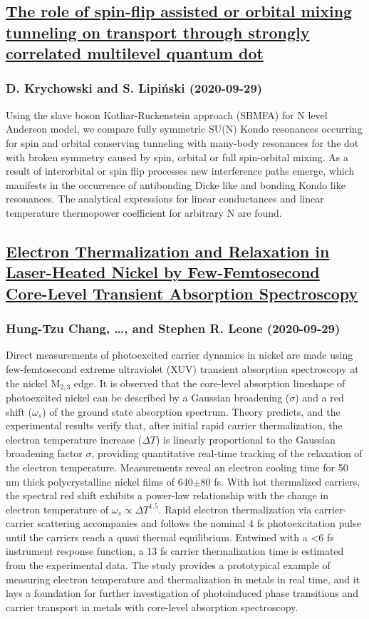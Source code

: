 \subsection*{\href{http://arxiv.org/abs/2009.14122v1}{The role of spin-flip assisted or orbital mixing tunneling on transport  through strongly correlated multilevel quantum dot}}
\subsubsection*{D. Krychowski and S. Lipiński (2020-09-29)}
Using the slave boson Kotliar-Ruckenstein approach (SBMFA) for N level
Anderson model, we compare fully symmetric SU(N) Kondo resonances occurring for
spin and orbital conserving tunneling with many-body resonances for the dot
with broken symmetry caused by spin, orbital or full spin-orbital mixing. As a
result of interorbital or spin flip processes new interference paths emerge,
which manifests in the occurrence of antibonding Dicke like and bonding Kondo
like resonances. The analytical expressions for linear conductances and linear
temperature thermopower coefficient for arbitrary N are found.

\subsection*{\href{http://arxiv.org/abs/2009.14118v1}{Electron Thermalization and Relaxation in Laser-Heated Nickel by  Few-Femtosecond Core-Level Transient Absorption Spectroscopy}}
\subsubsection*{Hung-Tzu Chang, \dots, and Stephen R. Leone (2020-09-29)}
Direct measurements of photoexcited carrier dynamics in nickel are made using
few-femtosecond extreme ultraviolet (XUV) transient absorption spectroscopy at
the nickel M$_{2,3}$ edge. It is observed that the core-level absorption
lineshape of photoexcited nickel can be described by a Gaussian broadening
($\sigma$) and a red shift ($\omega_{s}$) of the ground state absorption
spectrum. Theory predicts, and the experimental results verify that, after
initial rapid carrier thermalization, the electron temperature increase
($\Delta T$) is linearly proportional to the Gaussian broadening factor
$\sigma$, providing quantitative real-time tracking of the relaxation of the
electron temperature. Measurements reveal an electron cooling time for 50 nm
thick polycrystalline nickel films of 640$\pm$80 fs. With hot thermalized
carriers, the spectral red shift exhibits a power-law relationship with the
change in electron temperature of $\omega_{s}\propto\Delta T^{1.5}.$ Rapid
electron thermalization via carrier-carrier scattering accompanies and follows
the nominal 4 fs photoexcitation pulse until the carriers reach a quasi thermal
equilibrium. Entwined with a <6 fs instrument response function, a 13 fs
carrier thermalization time is estimated from the experimental data. The study
provides a prototypical example of measuring electron temperature and
thermalization in metals in real time, and it lays a foundation for further
investigation of photoinduced phase transitions and carrier transport in metals
with core-level absorption spectroscopy.

